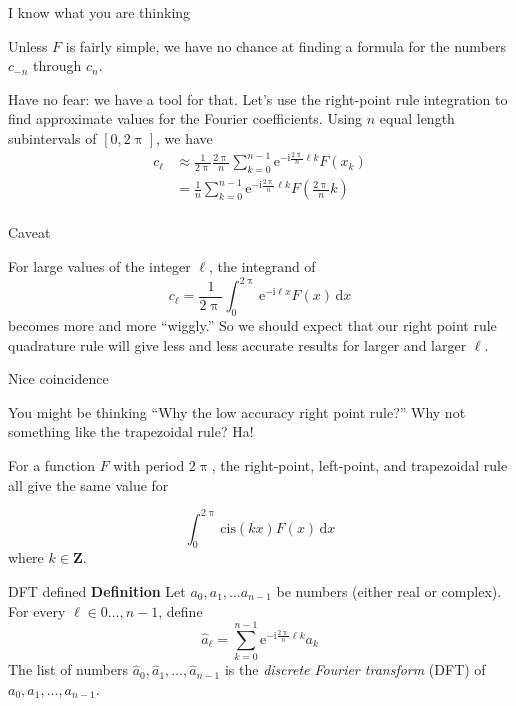 \documentclass[portrait,fleqn,12pt]{beamer}
\newcommand{\integers}{\mathbf{Z}}
\newcommand{\cis}{\mathrm{cis}}
\newcommand{\euler}{\mathrm{e}}
\newcommand{\imag}{\mathrm{i}}
\newenvironment{define}[1]{
  \textbf{Definition} #1}{}
\begin{document}
 \begin{frame}{I know what you are thinking}
 
 Unless $F$ is fairly simple, we have no chance at finding a formula for the numbers $c_{-n}$ through $c_n$.  
 
 Have no fear: we have
 a tool for that.  Let's use the right-point rule integration to find approximate values for the Fourier coefficients. Using $n$ equal length 
 subintervals of $[0, 2 \uppi]$, we have
\begin{align*}
  c_\ell &\approx \frac{1}{2 \uppi}  \frac{2 \uppi}{n} \sum_{k=0}^{n-1}  \euler^{-  \imag \frac{2 \uppi}{n}  \ell  k} F(x_k) \\
            &=  \frac{1}{n} \sum_{k=0}^{n-1}  \euler^{-  \imag \frac{2 \uppi}{n}  \ell  k} F \left (\frac{2 \uppi}{n} k \right)  \\
\end{align*}
 
  \end{frame}
  
  \begin{frame}{Caveat}
  
  For large values of the integer $\ell$, the integrand of
  \begin{equation*}
   c_\ell = \frac{1}{2 \uppi} \int_0^{2 \uppi} \euler^{-\imag  \ell x} F(x) \, \mathrm{d}x
\end{equation*}
becomes more and more ``wiggly.''  So we should expect that our right point rule quadrature rule will give less and less 
accurate results for larger and larger $\ell$.
  
  \vfill
  
  
  \end{frame}
  
  \begin{frame}{Nice coincidence}
  
  You might be thinking ``Why the low accuracy right point rule?'' Why not something like the trapezoidal rule?  Ha!
  
  For a function $F$ with period $2 \uppi$, the right-point, left-point, and trapezoidal rule all give the same value for
  
  \begin{equation}
     \int_0^{2 \uppi} \cis(k x) F(x) \, \mathrm{d} x
  \end{equation}
  where $k \in \integers$.
  
  \end{frame}
  
  \begin{frame}{DFT defined}
  \begin{define}  Let $a_0, a_1, \dots a_{n-1}$ be numbers (either real or complex).   For every $\ell \in 0 \dots, n-1$, define
  \begin{equation*}
      \widehat a_\ell = \sum_{k=0}^{n-1}  \euler^{-  \imag \frac{2 \uppi}{n}  \ell  k} a_k
  \end{equation*}
  The list of numbers  $\widehat a_0,  \widehat a_1, \dots, \widehat a_{n-1}$ is the \emph{discrete Fourier transform} (DFT) of 
  $a_0, a_1, \dots, a_{n-1}$.
  
  \end{define}
  \end{frame}
  
\end{document}

